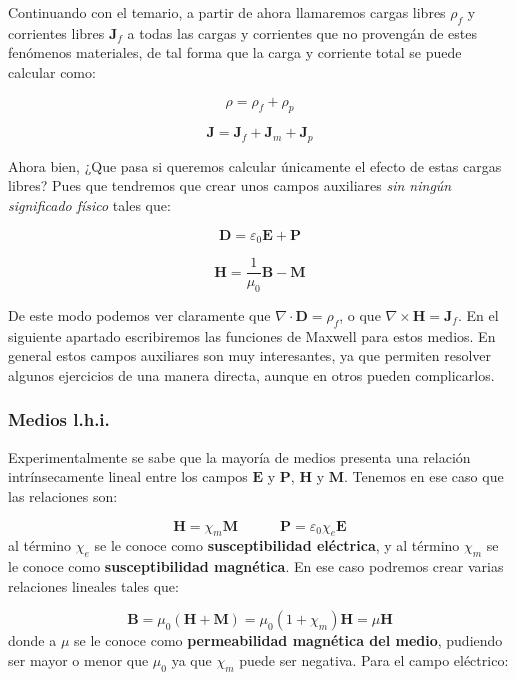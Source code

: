 \documentclass[12pt,a4paper]{article}
\newcommand{\tquad}{\quad \quad \quad}
\newcommand{\rota}{\nabla \times}
\newcommand{\dive}{\nabla \cdot}
\newcommand{\Bn}{\mathbf{B}}
\newcommand{\En}{\mathbf{E}}
\newcommand{\Dn}{\mathbf{D}}
\newcommand{\Hn}{\mathbf{H}}
\newcommand{\Jn}{\mathbf{J}}
\newcommand{\Pn}{\mathbf{P}}
\newcommand{\Mn}{\mathbf{M}}
\numberwithin{equation}{section}
\numberwithin{figure}{section}
\begin{document}
Continuando con el temario, a partir de ahora llamaremos cargas libres $\rho_f$ y corrientes libres $\Jn_f$ a todas las cargas y corrientes que no provengán de estes fenómenos materiales, de tal forma que la carga y corriente total se puede calcular como:

\begin{equation}
\rho = \rho_f + \rho_p
\end{equation}

\begin{equation}
\Jn = \Jn_f + \Jn_m + \Jn_p
\end{equation}

Ahora bien, ¿Que pasa si queremos calcular únicamente el efecto de estas cargas libres? Pues que tendremos que crear unos campos auxiliares \textit{sin ningún significado físico} tales que:

\begin{equation}
\Dn = \varepsilon_0 \En + \Pn
\end{equation}

\begin{equation}
\Hn = \dfrac{1}{\mu_0} \Bn - \Mn
\end{equation}

De este modo podemos ver claramente que $\dive \Dn = \rho_f$, o que $\rota \Hn = \Jn_f$. En el siguiente apartado escribiremos las funciones de Maxwell para estos medios. En general estos campos auxiliares son muy interesantes, ya que permiten resolver algunos ejercicios de una manera directa, aunque en otros pueden complicarlos. \\

\subsubsection{Medios l.h.i.}

Experimentalmente se sabe que la mayoría de medios presenta una relación intrínsecamente lineal entre los campos $\En$ y $\Pn$, $\Hn$ y $\Mn$. Tenemos en ese caso que las relaciones son:

\begin{equation}
\Hn = \chi_m \Mn \tquad \Pn =  \varepsilon_0 \chi_e \En
\end{equation}
al término $\chi_e$ se le conoce como \textbf{susceptibilidad eléctrica}, y al término $\chi_m$ se le conoce como \textbf{susceptibilidad magnética}. En ese caso podremos crear varias relaciones lineales tales que:

\begin{equation}
\Bn = \mu_0 (\Hn + \Mn) = \mu_0 (1 + \chi_m) \Hn = \mu \Hn\label{Ec:01.4.31}
\end{equation}
donde a $\mu$ se le conoce como \textbf{permeabilidad magnética del medio}, pudiendo ser mayor o menor que $\mu_0$ ya que $\chi_m$ puede ser negativa. Para el campo eléctrico:
\end{document}
